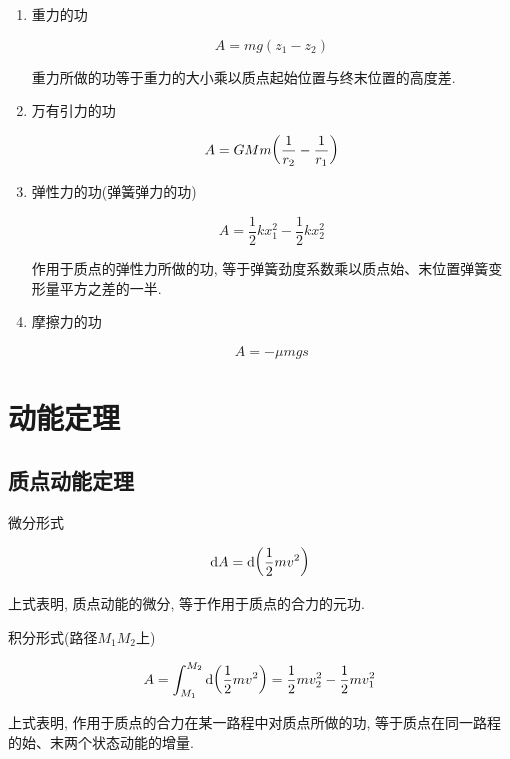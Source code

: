 \begin{enumerate}
	
	\item 重力的功
	
	\begin{equation}
		A = mg (z_1 - z_2) \label{C3-eq8}
	\end{equation}
	
	重力所做的功等于重力的大小乘以质点起始位置与终末位置的高度差. 
	
	\item 万有引力的功
	
	\begin{equation}
		A = GMm \qty(\dfrac{1}{r_2} - \dfrac{1}{r_1}) \label{C3-eq9}
	\end{equation}
	
	\item 弹性力的功(弹簧弹力的功)
	
	\begin{equation}
		A = \dfrac{1}{2}kx_1^2 - \dfrac{1}{2}kx_2^2 \label{C3-eq10}
	\end{equation}
	
	作用于质点的弹性力所做的功, 等于弹簧劲度系数乘以质点始、末位置弹簧变形量平方之差的一半. 
	
	\item 摩擦力的功
	
	\begin{equation}
		A = - \mu mgs \label{C3-eq11}
	\end{equation}
	
\end{enumerate}

\newpage

\section{动能定理} \label{3.3}

\subsection{质点动能定理}

\begin{theorem}[质点动能定理] \label{C3-th1}
	
	微分形式
	
	\begin{equation}
		\dd{A} = \dd{\qty(\dfrac{1}{2} m v^2)} \label{C3-eq12}
	\end{equation}
	
	上式表明, 质点动能的微分, 等于作用于质点的合力的元功. 
	
	\vskip 0.3cm
		
	积分形式(路径$M_1M_2$上)
	
	\begin{equation}
		A = \int_{M_1}^{M_2} \dd{\qty(\dfrac{1}{2} m v^2)} = \dfrac{1}{2} m v_2^2 - \dfrac{1}{2} m v_1^2 \label{C3-eq13}
	\end{equation}
	
	上式表明, 作用于质点的合力在某一路程中对质点所做的功, 等于质点在同一路程的始、末两个状态动能的增量. 
	
\end{theorem}

